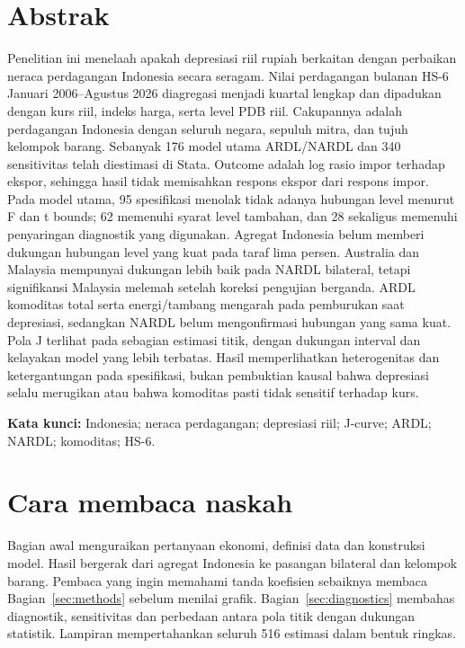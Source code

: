 \documentclass[11pt,a4paper]{article}
\begin{document}
\section*{Abstrak}
Penelitian ini menelaah apakah depresiasi riil rupiah berkaitan dengan perbaikan neraca perdagangan Indonesia secara seragam. Nilai perdagangan bulanan HS-6 Januari 2006--Agustus 2026 diagregasi menjadi kuartal lengkap dan dipadukan dengan kurs riil, indeks harga, serta level PDB riil. Cakupannya adalah perdagangan Indonesia dengan seluruh negara, sepuluh mitra, dan tujuh kelompok barang. Sebanyak 176 model utama ARDL/NARDL dan 340 sensitivitas telah diestimasi di Stata. Outcome adalah log rasio impor terhadap ekspor, sehingga hasil tidak memisahkan respons ekspor dari respons impor. Pada model utama, 95 spesifikasi menolak tidak adanya hubungan level menurut F dan t bounds; 62 memenuhi syarat level tambahan, dan 28 sekaligus memenuhi penyaringan diagnostik yang digunakan. Agregat Indonesia belum memberi dukungan hubungan level yang kuat pada taraf lima persen. Australia dan Malaysia mempunyai dukungan lebih baik pada NARDL bilateral, tetapi signifikansi Malaysia melemah setelah koreksi pengujian berganda. ARDL komoditas total serta energi/tambang mengarah pada pemburukan saat depresiasi, sedangkan NARDL belum mengonfirmasi hubungan yang sama kuat. Pola J terlihat pada sebagian estimasi titik, dengan dukungan interval dan kelayakan model yang lebih terbatas. Hasil memperlihatkan heterogenitas dan ketergantungan pada spesifikasi, bukan pembuktian kausal bahwa depresiasi selalu merugikan atau bahwa komoditas pasti tidak sensitif terhadap kurs.

\noindent\textbf{Kata kunci:} Indonesia; neraca perdagangan; depresiasi riil; J-curve; ARDL; NARDL; komoditas; HS-6.

\section*{Cara membaca naskah}
Bagian awal menguraikan pertanyaan ekonomi, definisi data dan konstruksi model. Hasil bergerak dari agregat Indonesia ke pasangan bilateral dan kelompok barang. Pembaca yang ingin memahami tanda koefisien sebaiknya membaca Bagian~\ref{sec:methods} sebelum menilai grafik. Bagian~\ref{sec:diagnostics} membahas diagnostik, sensitivitas dan perbedaan antara pola titik dengan dukungan statistik. Lampiran mempertahankan seluruh 516 estimasi dalam bentuk ringkas.
\end{document}
